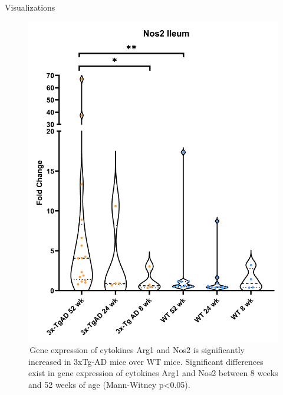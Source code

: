 \documentclass[final]{beamer}
\newlength{\colwidth}
\begin{document}
\begin{frame}[t]
\begin{columns}[t]
\begin{column}{\colwidth}
\begin{block}{Visualizations}
\begin{figure}[!htb]
\begin{center}
          \includegraphics[width=\linewidth]{assets/nos2_Ileum}
        \end{center}
      \endminipage\hfill
      \caption{\,Gene expression of cytokines Arg1 and Nos2 is significantly increased in 3xTg-AD mice over WT mice. Significant differences exist in gene expression of cytokines Arg1 and Nos2 between 8 weeks and 52 weeks of age (Mann-Witney p<0.05).}
      \label{fig:qpcrResults}
    \end{figure}




\end{block}
\end{column}
\end{columns}
\end{frame}
\end{document}
